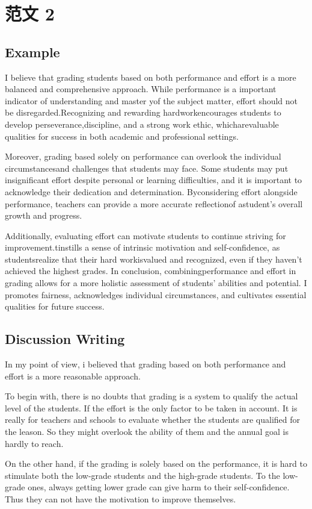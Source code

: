 \section{范文 2}

\subsection{Example}

I believe that grading students based on both performance and effort is a more balanced and comprehensive approach. While performance is a important indicator of understanding and master yof the subject matter, effort should not be disregarded.Recognizing and rewarding hardworkencourages students to develop perseverance,discipline, and a strong work ethic, whicharevaluable qualities for success in both academic and professional settings.

Moreover, grading based solely on performance can overlook the individual circumstancesand challenges that students may face. Some students may put insignificant effort despite personal or learning difficulties, and it is important to acknowledge their dedication and determination. Byconsidering effort alongside performance, teachers can provide a more accurate reflectionof astudent's overall growth and progress.

Additionally, evaluating effort can motivate students to continue striving for improvement.tinstills a sense of intrinsic motivation and self-confidence, as studentsrealize that their hard workisvalued and recognized, even if they haven't achieved the highest grades. In conclusion, combiningperformance and effort in grading allows for a more holistic assessment of students' abilities and potential. I promotes fairness, acknowledges individual circumstances, and cultivates essential
qualities for future success.

\subsection{Discussion Writing}

In my point of view, i believed that grading based on both performance and effort is a more reasonable approach.

To begin with, there is no doubts that grading is a system to qualify the actual level of the students. If the effort is the only factor to be taken in account. It is really for teachers and schools to evaluate whether the students are qualified for the leason. So they might overlook the ability of them and the annual goal is hardly to reach.

On the other hand, if the grading is solely based on the performance, it is hard to stimulate both the low-grade students and the high-grade students. To the low-grade ones, always getting lower grade can give harm to their self-confidence. Thus they can not have the motivation to improve themselves.
